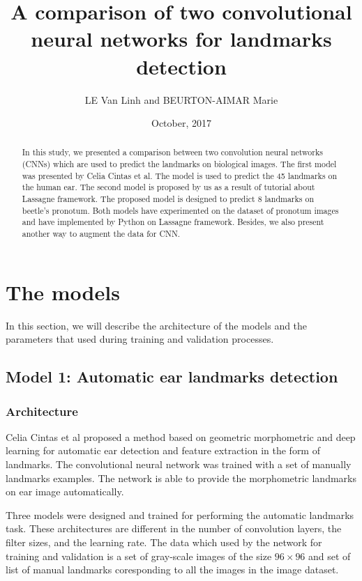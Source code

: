 \documentclass[12pt,a4paper]{article}
\begin{document}
\title{A comparison of two convolutional neural networks for landmarks detection }
\author{LE Van Linh and BEURTON-AIMAR Marie}
\date{October, 2017}
\maketitle
\begin{abstract}
	In this study, we presented a comparison between two convolution neural networks (CNNs) which are used to predict the landmarks on biological images. The first model was presented by Celia Cintas et al\cite{cintas2016automatic}. The model is used to predict the 45 landmarks on the human ear. The second model is proposed by us as a result of tutorial about Lassagne framework\cite{lasagne}. The proposed model is designed to predict 8 landmarks on beetle's pronotum. Both models have experimented on the dataset of pronotum images and have implemented by Python on Lassagne framework. Besides, we also present another way to augment the data for CNN.
\end{abstract}
\section{The models}
In this section, we will describe the architecture of the models and the parameters that used during training and validation processes.
\subsection{Model 1: Automatic ear landmarks detection}
\subsubsection{Architecture}
Celia Cintas et al\cite{cintas2016automatic} proposed a method based on geometric morphometric and deep learning for automatic ear detection and feature extraction in the form of landmarks. The convolutional neural network was trained with a set of manually landmarks examples. The network is able to provide the morphometric landmarks on ear image automatically.

Three models were designed and trained for performing the automatic landmarks task. These architectures are different in the number of convolution layers, the filter sizes, and the learning rate. The data which used by the network for training and validation is a set of gray-scale images of the size $96 \times 96$ and set of list of manual landmarks coresponding to all the images in the image dataset.%
\end{document}
